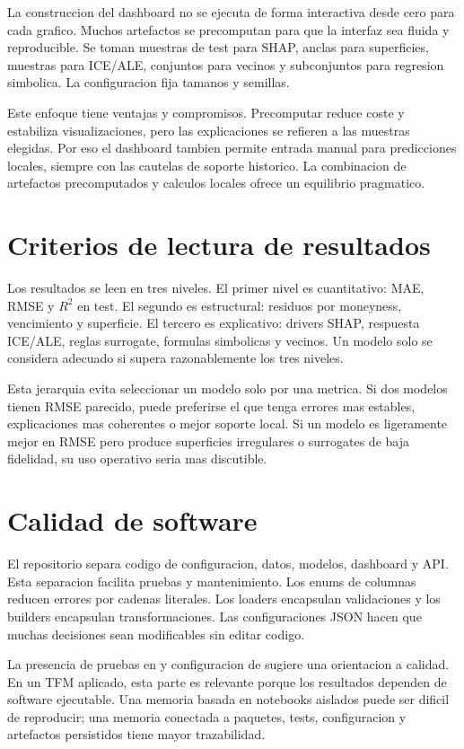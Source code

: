 La construccion del dashboard no se ejecuta de forma interactiva desde cero para cada grafico. Muchos artefactos se precomputan para que la interfaz sea fluida y reproducible. Se toman muestras de test para SHAP, anclas para superficies, muestras para ICE/ALE, conjuntos para vecinos y subconjuntos para regresion simbolica. La configuracion fija tamanos y semillas.

Este enfoque tiene ventajas y compromisos. Precomputar reduce coste y estabiliza visualizaciones, pero las explicaciones se refieren a las muestras elegidas. Por eso el dashboard tambien permite entrada manual para predicciones locales, siempre con las cautelas de soporte historico. La combinacion de artefactos precomputados y calculos locales ofrece un equilibrio pragmatico.

\section{Criterios de lectura de resultados}

Los resultados se leen en tres niveles. El primer nivel es cuantitativo: MAE, RMSE y $R^2$ en test. El segundo es estructural: residuos por moneyness, vencimiento y superficie. El tercero es explicativo: drivers SHAP, respuesta ICE/ALE, reglas surrogate, formulas simbolicas y vecinos. Un modelo solo se considera adecuado si supera razonablemente los tres niveles.

Esta jerarquia evita seleccionar un modelo solo por una metrica. Si dos modelos tienen RMSE parecido, puede preferirse el que tenga errores mas estables, explicaciones mas coherentes o mejor soporte local. Si un modelo es ligeramente mejor en RMSE pero produce superficies irregulares o surrogates de baja fidelidad, su uso operativo seria mas discutible.

\section{Calidad de software}

El repositorio separa codigo de configuracion, datos, modelos, dashboard y API. Esta separacion facilita pruebas y mantenimiento. Los enums de columnas reducen errores por cadenas literales. Los loaders encapsulan validaciones y los builders encapsulan transformaciones. Las configuraciones JSON hacen que muchas decisiones sean modificables sin editar codigo.

La presencia de pruebas en  y configuracion de  sugiere una orientacion a calidad. En un TFM aplicado, esta parte es relevante porque los resultados dependen de software ejecutable. Una memoria basada en notebooks aislados puede ser dificil de reproducir; una memoria conectada a paquetes, tests, configuracion y artefactos persistidos tiene mayor trazabilidad.


